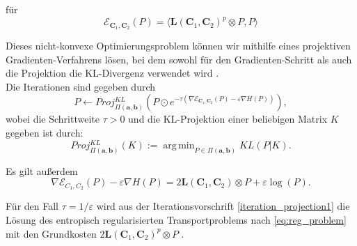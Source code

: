 \documentclass[twoside, 12pt,a4paper]{book}
\DeclareMathOperator*{\argmin}{arg\,min}
\newtheorem{definition}[theorem]{Definition}
\numberwithin{equation}{section}
\begin{document}
	\noindent für 
	\begin{equation}
		\mathcal{E}_{\boldsymbol{C}_1,\boldsymbol{C}_2}(P) = \langle \boldsymbol{L}(\boldsymbol{C}_1,\boldsymbol{C}_2)^p \otimes P, P \rangle
	\end{equation}
	
	\noindent Dieses nicht-konvexe Optimierungsproblem können wir mithilfe eines projektiven Gradienten-Verfahrens lösen, bei dem sowohl für den Gradienten-Schritt als auch die Projektion die KL-Divergenz verwendet wird \cite{gwd_averaging_kernels}.\\
	
	\noindent Die Iterationen sind gegeben durch
	\begin{equation}
	P \leftarrow Proj_{\Pi(\boldsymbol{a},\boldsymbol{b})}^{KL} \left(P \odot e^{-\tau( \nabla \boldsymbol{\mathcal{E}}_{\boldsymbol{C}_1, \boldsymbol{C}_2}(P) -\varepsilon \nabla H(P))} \right), \label{iteration_projection1}
	\end{equation}
	wobei die Schrittweite $\tau > 0$ und die KL-Projektion einer beliebigen Matrix $K$ gegeben ist durch:
	\begin{equation}
	Proj_{\Pi(\boldsymbol{a},\boldsymbol{b})}^{KL}(K) := \argmin_{P \in \Pi (\boldsymbol{a},\boldsymbol{b})} KL(P|K).
	\end{equation}
	
	\noindent Es gilt außerdem
	\begin{equation}
	\nabla \boldsymbol{\mathcal{E}}_{C_1, C_2}(P) -\varepsilon \nabla H(P) = 2\boldsymbol{L}(\boldsymbol{C}_1,\boldsymbol{C}_2) \otimes P + \varepsilon\log (P).
	\end{equation}
	
	\noindent Für den Fall $\tau= 1/\varepsilon$ wird aus der Iterationsvorschrift \eqref{iteration_projection1} die Lösung des entropisch regularisierten Transportproblems nach \eqref{eq:reg_problem} mit den Grundkosten $2\boldsymbol{L}(\boldsymbol{C}_1, \boldsymbol{C}_2)^p \otimes P$ \cite{gwd_averaging_kernels}.
		
		
	
	

	
\end{document}
